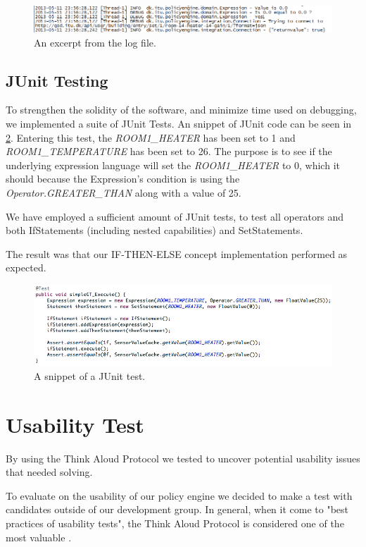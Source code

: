 \begin{figure}[ht]
\centering
\includegraphics[width=\columnwidth]{images/logoutput.png}
\caption{An excerpt from the log file.}
\label{fig:log}
\end{figure}

\subsection{JUnit Testing}
To strengthen the solidity of the software, and minimize time used on debugging, we implemented a suite of JUnit Tests. An snippet of JUnit code can be seen in \ref{fig:junit-example}. Entering this test, the \textit{ROOM1\_HEATER} has been set to 1 and \textit{ROOM1\_TEMPERATURE} has been set to 26. The purpose is to see if the underlying expression language will set the \textit{ROOM1\_HEATER} to 0, which it should because the Expression's condition is using the \textit{Operator.GREATER\_THAN} along with a value of 25.
 
We have employed a sufficient amount of JUnit tests, to test all operators and both IfStatements (including nested capabilities) and SetStatements.

The result was that our IF-THEN-ELSE concept implementation performed as expected.

\begin{figure}[ht]
\centering
\includegraphics[scale=.5]{images/appendix-junit-example.png}
\caption{A snippet of a JUnit test.}
\label{fig:junit-example}
\end{figure}

\section{Usability Test}\label{sec:usability-test}
By using the Think Aloud Protocol we tested to uncover potential usability issues that needed solving.

To evaluate on the usability of our policy engine we decided to make a test with candidates outside of our development group. In general, when it come to "best practices of usability tests", the Think Aloud Protocol is considered one of the most valuable \cite{Nielsen1993}.

